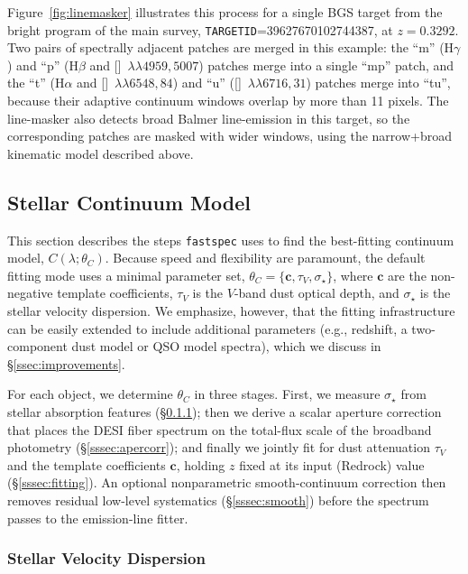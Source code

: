 \documentclass[modern,linenumbers]{aastex702}
\newcommand{\fastspec}{\texttt{fastspec}}
\newcommand{\ha}{\ensuremath{\mathrm{H}\alpha}}
\newcommand{\hb}{\ensuremath{\mathrm{H}\beta}}
\newcommand{\oiiidoublet}{[\ion{O}{3}]~$\lambda\lambda4959,5007$}
\newcommand{\niidoublet}{[\ion{N}{2}]~$\lambda\lambda6548,84$}
\newcommand{\siidoublet}{[\ion{S}{2}]~$\lambda\lambda6716,31$}
\newcommand{\vdisp}{\ensuremath{\sigma_\star}}
\newcommand{\tauv}{\ensuremath{\tau_V}}
\begin{document}
Figure~\ref{fig:linemasker} illustrates this process for a single BGS
target from the bright program of the main survey,
\texttt{TARGETID}=39627670102744387, at $z=0.3292$. Two pairs of
spectrally adjacent patches are merged in this example: the ``m''
(H$\gamma$) and ``p'' (\hb{} and \oiiidoublet) patches merge into a
single ``mp'' patch, and the ``t'' (\ha{} and \niidoublet) and ``u''
(\siidoublet) patches merge into ``tu'', because their adaptive
continuum windows overlap by more than 11 pixels. The line-masker also
detects broad Balmer line-emission in this target, so the
corresponding patches are masked with wider windows, using the
narrow+broad kinematic model described above.

\subsection{Stellar Continuum Model}
\label{ssec:continuum}

This section describes the steps \fastspec{} uses to find the
best-fitting continuum model, $C(\lambda;\theta_C)$. Because speed and
flexibility are paramount, the default fitting mode uses a minimal
parameter set, $\theta_C = \{\mathbf{c},\tauv,\vdisp\}$, where
$\mathbf{c}$ are the non-negative
template coefficients, $\tauv$ is the $V$-band dust optical depth, and
$\vdisp$ is the stellar velocity dispersion. We emphasize, however,
that the fitting infrastructure can be easily extended to include
additional parameters (e.g., redshift, a two-component dust
model or QSO model spectra), which we discuss in
\S\ref{ssec:improvements}.

For each object, we determine $\theta_C$ in three stages. First, we
measure $\vdisp$ from stellar absorption features
(\S\ref{sssec:vdisp}); then we derive a scalar aperture correction
that places the DESI fiber spectrum on the total-flux scale of the
broadband photometry (\S\ref{sssec:apercorr}); and finally we jointly
fit for dust attenuation $\tauv$ and the template coefficients
$\mathbf{c}$, holding $z$ fixed at its input (Redrock) value
(\S\ref{sssec:fitting}). An optional nonparametric smooth-continuum
correction then removes residual low-level systematics
(\S\ref{sssec:smooth}) before the spectrum passes to the emission-line
fitter.

\subsubsection{Stellar Velocity Dispersion}
\label{sssec:vdisp}
\end{document}
